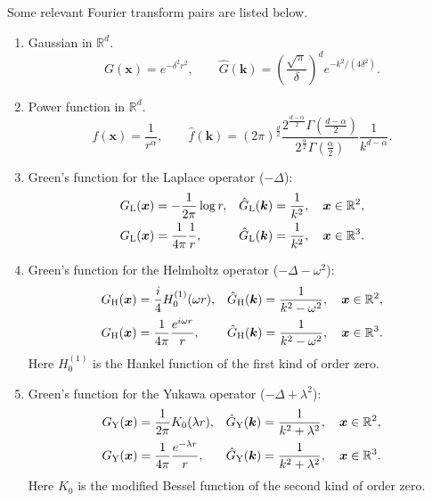 \documentclass[final,letterpaper]{siamart171218}
\newcommand{\be}{\begin{equation}}
\newcommand{\ee}{\end{equation}}
\newcommand{\ba}{\begin{aligned}}
\newcommand{\ea}{\end{aligned}}
\newcommand{\x}{\boldsymbol{x}}
\newcommand{\bk}{\boldsymbol{k}}
\begin{document}
Some relevant Fourier transform pairs are listed below.
\begin{enumerate}[label=(\alph*)]
\item Gaussian in $\mathbb{R}^d$.
  \be\label{gaussiankernel}
  G(\x)=e^{-\delta^2 r^2}, \qquad \hat{G}(\bk) = \left(\frac{\sqrt{\pi}}{\delta}\right)^{d}
  e^{-k^2/(4\delta^2)}.
  \ee
\item Power function in $\mathbb{R}^d$.
  \be\label{powerfunction}
  f(\x)=\frac{1}{r^\alpha}, \qquad \hat{f}(\bk) = (2\pi)^{\frac{d}{2}}
  \frac{2^{\frac{d-\alpha}{2}}\Gamma\left(\frac{d-\alpha}{2}\right)}
       {2^{\frac{\alpha}{2}}\Gamma\left(\frac{\alpha}{2}\right)}
       \frac{1}{k^{d-\alpha}}.
  \ee
\item Green's function for 
  the Laplace operator ($-\Delta$):
  \be
\label{laplaceker}
  \ba
  G_{\rm L}(\x) &= -\frac{1}{2\pi} \log r,
  & \hat{G}_{\rm L}(\bk) = \frac{1}{k^2}, \quad \x\in\mathbb{R}^2, \\
  G_{\rm L}(\x) &= \frac{1}{4\pi} \frac{1}{r},
  & \hat{G}_{\rm L}(\bk) = \frac{1}{k^2}, \quad \x\in\mathbb{R}^3.
  \ea
  \ee
\item Green's function for 
  the Helmholtz operator ($-\Delta-\omega^2$): 
  \be\label{helmholtzker}
  \ba
  G_{\rm H}(\x) &= \frac{i}{4} H_0^{(1)}(\omega r),
  & \hat{G}_{\rm H}(\bk) = \frac{1}{k^2-\omega^2}, \quad \x\in\mathbb{R}^2, \\
  G_{\rm H}(\x) &= \frac{1}{4\pi} \frac{e^{i\omega r}}{r},
  & \hat{G}_{\rm H}(\bk) = \frac{1}{k^2-\omega^2}, \quad \x\in\mathbb{R}^3.
  \ea
  \ee
  Here $H_0^{(1)}$ is the Hankel function of the first kind of order zero.
\item Green's function for 
  the Yukawa operator ($-\Delta+\lambda^2$):
  \be\label{yukawakernelfouriertransform}
  \ba
  G_{\rm Y}(\x) &= \frac{1}{2\pi} K_0(\lambda r),
  & \hat{G}_{\rm Y}(\bk) = \frac{1}{k^2+\lambda^2}, \quad \x\in\mathbb{R}^2, \\
  G_{\rm Y}(\x) &= \frac{1}{4\pi} \frac{e^{-\lambda r}}{r},
  & \hat{G}_{\rm Y}(\bk) = \frac{1}{k^2+\lambda^2}, \quad \x\in\mathbb{R}^3.
  \ea
  \ee
  Here $K_0$ is the modified Bessel function of the second kind of order zero.
\end{enumerate}
\end{document}
